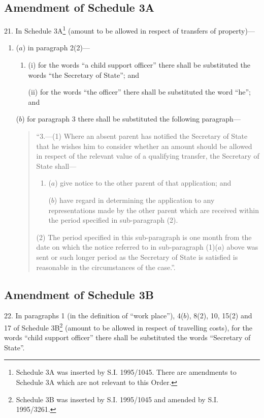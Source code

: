 \documentclass[12pt,a4paper]{article}
\begin{document}
\subsection[21. Amendment of Schedule 3A]{Amendment of Schedule 3A}

21.  In Schedule 3A\footnote{\frenchspacing Schedule 3A was inserted by S.I. 1995/1045. There are amendments to Schedule 3A which are not relevant to this Order.} (amount to be allowed in respect of transfers of property)—
\begin{enumerate}\item[]
($a$) in paragraph 2(2)—
\begin{enumerate}\item[]
(i) for the words “a child support officer” there shall be substituted the words “the Secretary of State”; and

(ii) for the words “the officer” there shall be substituted the word “he”; and
\end{enumerate}

($b$) for paragraph 3 there shall be substituted the following paragraph—
\begin{quotation}
“3.—(1) Where an absent parent has notified the Secretary of State that he wishes him to consider whether an amount should be allowed in respect of the relevant value of a qualifying transfer, the Secretary of State shall—
\begin{enumerate}\item[]
($a$) give notice to the other parent of that application; and

($b$) have regard in determining the application to any representations made by the other parent which are received within the period specified in sub-paragraph (2).
\end{enumerate}

(2) The period specified in this sub-paragraph is one month from the date on which the notice referred to in sub-paragraph (1)($a$) above was sent or such longer period as the Secretary of State is satisfied is reasonable in the circumstances of the case.”.
\end{quotation}
\end{enumerate}

\subsection[22. Amendment of Schedule 3B]{Amendment of Schedule 3B}

22.  In paragraphs 1 (in the definition of “work place”), 4($b$), 8(2), 10, 15(2) and 17 of Schedule 3B\footnote{\frenchspacing Schedule 3B was inserted by S.I. 1995/1045 and amended by S.I. 1995/3261.} (amount to be allowed in respect of travelling costs), for the words “child support officer” there shall be substituted the words “Secretary of State”.
\end{document}
